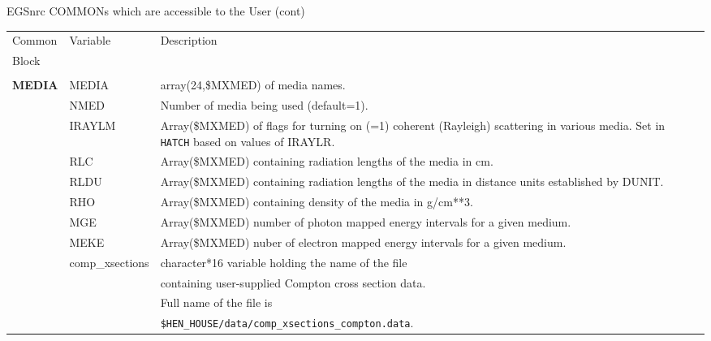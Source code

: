\begin{table}[htb]
        
     
        
       
       
      

    \begin{center}
    EGSnrc COMMONs which are accessible to the User (cont)\vspace*{2mm}
    \begin{tabular}{ l  l   p{105mm}l  |}
    \hline
    Common & Variable & Description \\
    Block &&\\
    \hline
&&\\
{\bfseries MEDIA}	& MEDIA	&array(24,\$MXMED)  of media names.\\
	& NMED	& Number of media being used
                            (default=1).\\
          & IRAYLM & Array(\$MXMED) of flags for turning on (=1)
                            coherent (Rayleigh) scattering in
                            various media.  Set in {\tt HATCH} based
                            on values of IRAYLR.  \\
          & RLC   & Array(\$MXMED) containing radiation
                            lengths of the media in cm.  \\
	& RLDU  &  Array(\$MXMED) containing radiation
                            lengths of the media in distance
                            units established by DUNIT.\\
	&RHO	& Array(\$MXMED) containing density of the
                            media in g/cm**3.\\
        &MGE    & Array(\$MXMED) number of photon mapped energy intervals for
                  a given medium.\\
        &MEKE   & Array(\$MXMED) nuber of electron mapped energy intervals for
                  a given medium.\\
       &comp\_xsections & character*16 variable holding the name of the file\\
       && containing user-supplied Compton cross section data.\\
       &&  Full name of the file is\\
       && {\tt \$HEN\_HOUSE/data/comp\_xsections\_compton.data}.\\

\end{tabular}
\end{center}
\end{table}
